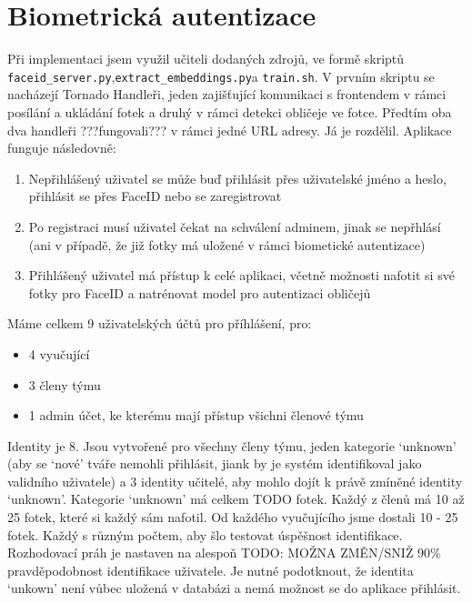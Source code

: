 \section{Biometrická autentizace}
Při implementaci jsem využil učiteli dodaných zdrojů, ve formě skriptů \verb|faceid_server.py|,\newline \verb|extract_embeddings.py|a \verb|train.sh|.
V prvním skriptu se nacházejí Tornado Handleři, jeden zajišťující komunikaci s frontendem v rámci posílání a ukládání fotek a druhý v rámci detekci obličeje ve fotce.
Předtím oba dva handleři ???fungovali??? v rámci jedné URL adresy. Já je rozdělil. Aplikace funguje následovně:
\begin{enumerate}
    \item Nepřihlášený uživatel se může buď přihlásit přes uživatelské jméno a heslo, přihlásit se přes FaceID nebo se zaregistrovat
    \item Po registraci musí uživatel čekat na schválení adminem, jinak se nepřhlásí (ani v případě, že již fotky má uložené v rámci biometické autentizace)
    \item Přihlášený uživatel má přístup k celé aplikaci, včetně možnosti nafotit si své fotky pro FaceID a natrénovat model pro autentizaci obličejů
\end{enumerate} 

Máme celkem 9 uživatelských účtů pro příhlášení, pro: 
\begin{itemize}
    \item 4 vyučující%
    \item 3 členy týmu
    \item 1 admin účet, ke kterému mají přístup všichni členové týmu
\end{itemize}
Identity je 8. Jsou vytvořené pro všechny členy týmu, jeden kategorie `unknown' (aby se `nové' tváře nemohli přihlásit, jiank by je systém identifikoval jako validního uživatele) a 3 identity učitelé, aby mohlo dojít k právě zmíněné identity `unknown'.
Kategorie `unknown' má celkem TODO fotek.
Každý z členů má 10 až 25 fotek, které si každý sám nafotil.
Od každého vyučujícího jsme dostali 10 - 25 fotek. Každý s různým počtem, aby šlo testovat úspěšnost identifikace.
Rozhodovací práh je nastaven na alespoň TODO: MOŽNA ZMĚN/SNIŽ 90\% pravděpodobnost identifikace uživatele. 
Je nutné podotknout, že identita `unkown' není vůbec uložená v databázi a nemá možnost se do aplikace přihlásit.